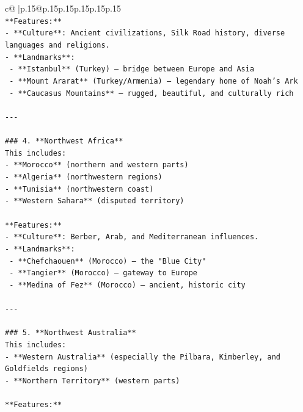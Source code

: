\documentclass{article}
\begin{document}
{\begin{supertabular}{c@{$\;$}|p{.15\linewidth}@{}p{.15\linewidth}p{.15\linewidth}p{.15\linewidth}p{.15\linewidth}p{.15\linewidth}}
{{{\\ 
\texttt{**Features:**} \\
\texttt{{-} **Culture**: Ancient civilizations, Silk Road history, diverse languages and religions.} \\
\texttt{{-} **Landmarks**:} \\
\texttt{  {-} **Istanbul** (Turkey) — bridge between Europe and Asia} \\
\texttt{  {-} **Mount Ararat** (Turkey/Armenia) — legendary home of Noah’s Ark} \\
\texttt{  {-} **Caucasus Mountains** — rugged, beautiful, and culturally rich} \\
\\ 
\texttt{{-}{-}{-}} \\
\\ 
\texttt{\#\#\# 4. **Northwest Africa**} \\
\texttt{This includes:} \\
\texttt{{-} **Morocco** (northern and western parts)} \\
\texttt{{-} **Algeria** (northwestern regions)} \\
\texttt{{-} **Tunisia** (northwestern coast)} \\
\texttt{{-} **Western Sahara** (disputed territory)} \\
\\ 
\texttt{**Features:**} \\
\texttt{{-} **Culture**: Berber, Arab, and Mediterranean influences.} \\
\texttt{{-} **Landmarks**:} \\
\texttt{  {-} **Chefchaouen** (Morocco) — the "Blue City"} \\
\texttt{  {-} **Tangier** (Morocco) — gateway to Europe} \\
\texttt{  {-} **Medina of Fez** (Morocco) — ancient, historic city} \\
\\ 
\texttt{{-}{-}{-}} \\
\\ 
\texttt{\#\#\# 5. **Northwest Australia**} \\
\texttt{This includes:} \\
\texttt{{-} **Western Australia** (especially the Pilbara, Kimberley, and Goldfields regions)} \\
\texttt{{-} **Northern Territory** (western parts)} \\
\\ 
\texttt{**Features:**} \\
}}}
\end{supertabular}}
\end{document}
